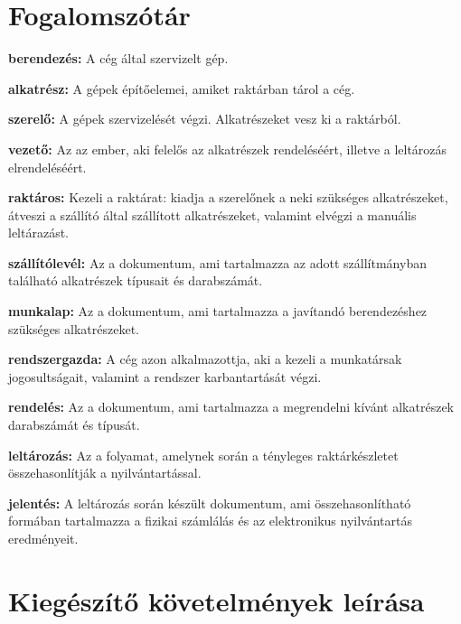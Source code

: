 \documentclass[12pt]{article}\usepackage[left=20mm,right=20mm,top=14mm,bottom=20mm]{geometry}
\begin{document}
\section{Fogalomszótár}
\noindent\textbf{berendezés: } A cég által szervizelt gép.
\vspace{4mm}

\noindent\textbf{alkatrész: } A gépek építőelemei, amiket raktárban tárol a cég. 
\vspace{4mm}

\noindent\textbf{szerelő: } A gépek szervizelését végzi. Alkatrészeket vesz ki a raktárból.
\vspace{4mm}

\noindent\textbf{vezető: } Az az ember, aki felelős az alkatrészek rendeléséért, illetve a leltározás elrendeléséért.
\vspace{4mm}

\noindent\textbf{raktáros: } Kezeli a raktárat: kiadja a szerelőnek a neki szükséges alkatrészeket, átveszi a szállító által szállított alkatrészeket, valamint elvégzi a manuális leltárazást.
\vspace{4mm}

\noindent\textbf{szállítólevél: } Az a dokumentum, ami tartalmazza az adott szállítmányban található alkatrészek típusait és darabszámát.
\vspace{4mm}

\noindent\textbf{munkalap: } Az a dokumentum, ami tartalmazza a javítandó berendezéshez szükséges alkatrészeket. 
\vspace{4mm}

\noindent\textbf{rendszergazda: } A cég azon alkalmazottja, aki a kezeli a munkatársak jogosultságait, valamint a rendszer karbantartását végzi.
\vspace{4mm}

\noindent\textbf{rendelés: } Az a dokumentum, ami tartalmazza a megrendelni kívánt alkatrészek darabszámát és típusát.
\vspace{4mm}

\noindent\textbf{leltározás: } Az a folyamat, amelynek során a tényleges raktárkészletet összehasonlítják a nyilvántartással.

\noindent\textbf{jelentés: } A leltározás során készült dokumentum, ami összehasonlítható formában tartalmazza a fizikai számlálás és az elektronikus nyilvántartás eredményeit.

\section{Kiegészítő követelmények leírása}
\end{document}
